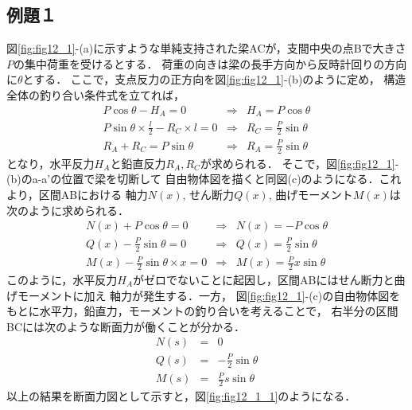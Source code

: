 ﻿\documentclass[10pt,a4j]{jbook}
\begin{document}
\subsection{例題１}
図\ref{fig:fig12_1}-(a)に示すような単純支持された梁ACが，支間中央の点Bで大きさ$P$の集中荷重を受けるとする．
荷重の向きは梁の長手方向から反時計回りの方向に$\theta$とする．
ここで，支点反力の正方向を図\ref{fig:fig12_1}-(b)のように定め，
構造全体の釣り合い条件式を立てれば，
\begin{eqnarray}
	P\cos\theta-H_A=0 & \Rightarrow & H_A=P\cos\theta \\
	P\sin\theta \times \frac{l}{2}-R_C\times l =0 & \Rightarrow & R_C=\frac{P}{2}\sin\theta \\
	R_A+R_C=P\sin\theta & \Rightarrow & R_A=\frac{P}{2}\sin\theta
\end{eqnarray}
となり，水平反力$H_A$と鉛直反力$R_A,R_C$が求められる．
そこで，図\ref{fig:fig12_1}-(b)のa-a'の位置で梁を切断して
自由物体図を描くと同図(c)のようになる．これより，区間ABにおける
軸力$N(x)$, せん断力$Q(x)$, 曲げモーメント$M(x)$は次のように求められる．
\begin{eqnarray}
	N(x)+P\cos\theta=0 & \Rightarrow & N(x)=-P\cos\theta \\
	Q(x)-\frac{P}{2}\sin\theta=0 & \Rightarrow & Q(x)=\frac{P}{2}\sin\theta \\
	M(x)-\frac{P}{2}\sin\theta\times x =0 & \Rightarrow & M(x)=\frac{P}{2}x\sin\theta
\end{eqnarray}
このように，水平反力$H_A$がゼロでないことに起因し，区間ABにはせん断力と曲げモーメントに加え
軸力が発生する．一方，
図\ref{fig:fig12_1}-(c)の自由物体図をもとに水平力，鉛直力，モーメントの釣り合いを考えることで，
右半分の区間BCには次のような断面力が働くことが分かる．
\begin{eqnarray}
	N(s)&=& 0 \\
	Q(s)&=&-\frac{P}{2}\sin\theta \\
	M(s)&=&\frac{P}{2}s \sin\theta
\end{eqnarray}
以上の結果を断面力図として示すと，図\ref{fig:fig12_1_1}のようになる．
\end{document}
